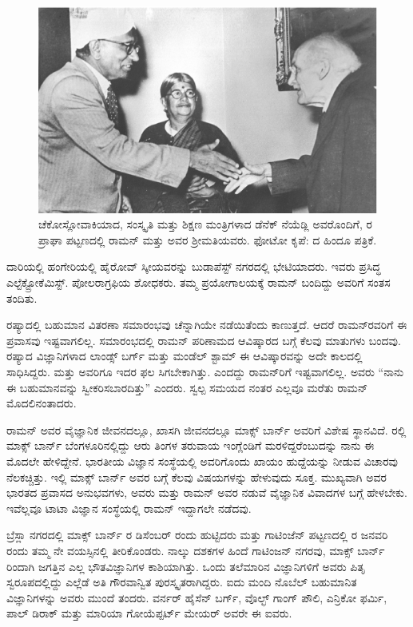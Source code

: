 \begin{figure}[!b]
\centering
\includegraphics[scale=0.225]{"images/9.jpg"}
\caption{ಚೆಕೋಸ್ಲೋವಾಕಿಯಾದ, ಸಂಸ್ಕೃತಿ ಮತ್ತು ಶಿಕ್ಷಣ ಮಂತ್ರಿಗಳಾದ ಡೆನೆಕ್ ನೆಯೆಡ್ಲಿ ಅವರೊಂದಿಗೆ, ರ ಪ್ರಾಘಾ ಪಟ್ಟಣದಲ್ಲಿ ರಾಮನ್ ಮತ್ತು ಅವರ ಶ‍್ರೀಮತಿಯವರು. ಫೋಟೋ ಕೃಪೆ: ದ ಹಿಂದೂ ಪತ್ರಿಕೆ.}\label{chap3-fig02}
\end{figure}

ದಾರಿಯಲ್ಲಿ ಹಂಗೇರಿಯಲ್ಲಿ ಹೈರೋವ್ ಸ್ಕೀಯವರನ್ನು ಬುಡಾಪೆಸ್ಟ್ ನಗರದಲ್ಲಿ ಭೇಟಿಯಾದರು. ಇವರು ಪ್ರಸಿದ್ಧ ಎಲ್ಟೆಕ್ಟ್ರೋಕೆಮಿಸ್ಟ್. ಪೋಲರಾಗ್ರಫಿಯ ಶೋಧಕರು. ತಮ್ಮ ಪ್ರಯೋಗಾಲಯಕ್ಕೆ ರಾಮನ್ ಬಂದಿದ್ದು ಅವರಿಗೆ ಸಂತಸ ತಂದಿತು.

ರಷ್ಯಾದಲ್ಲಿ ಬಹುಮಾನ ವಿತರಣಾ ಸಮಾರಂಭವು ಚೆನ್ನಾಗಿಯೇ ನಡೆಯಿತೆಂದು ಕಾಣುತ್ತದೆ. ಆದರೆ ರಾಮನ್‍ರವರಿಗೆ ಈ ಪ್ರವಾಸವು ಇಷ್ಟವಾಗಲಿಲ್ಲ. ಸಮಾರಂಭದಲ್ಲಿ ರಾಮನ್ ಪರಿಣಾಮದ ಆವಿಷ್ಕಾರದ ಬಗ್ಗೆ ಕೆಲವು ಮಾತುಗಳು ಬಂದವು. ರಷ್ಯಾದ ವಿಜ್ಞಾನಿಗಳಾದ ಲಾಂಡ್ಸ್ ಬರ್ಗ್ ಮತ್ತು ಮಂಡೆಲ್ ಶ್ಟಾಮ್ ಈ ಆವಿಷ್ಕಾರವನ್ನು ಅದೇ ಕಾಲದಲ್ಲಿ ಸಾಧಿಸಿದ್ದರು. ಮತ್ತು ಅವರಿಗೂ ಇದರ ಫಲ ಸಿಗಬೇಕಾಗಿತ್ತು. ಎಂದದ್ದು ರಾಮನ್‍ರಿಗೆ ಇಷ್ಟವಾಗಲಿಲ್ಲ. ಅವರು “ನಾನು ಈ ಬಹುಮಾನವನ್ನು ಸ್ವೀಕರಿಸಬಾರದಿತ್ತು” ಎಂದರು. ಸ್ವಲ್ಪ ಸಮಯದ ನಂತರ ಎಲ್ಲವೂ ಮರೆತು ರಾಮನ್ ಮೊದಲಿ\-ನಂತಾದರು.



ರಾಮನ್ ಅವರ ವೈಜ್ಞಾನಿಕ ಜೀವನದಲ್ಲೂ, ಖಾಸಗಿ ಜೀವನದಲ್ಲೂ ಮಾಕ್ಸ್ ಬಾರ್ನ್ ಅವರಿಗೆ ವಿಶೇಷ ಸ್ಥಾನವಿದೆ. ರಲ್ಲಿ ಮಾಕ್ಸ್ ಬಾರ್ನ್ ಬೆಂಗಳೂರಿನಲ್ಲಿದ್ದು ಆರು ತಿಂಗಳ ತರುವಾಯ ಇಂಗ್ಲೆಂಡಿಗೆ ಮರಳಿದ್ದರೆಂಬುದನ್ನು ನಾನು ಈ ಮೊದಲೇ ಹೇಳಿದ್ದೇನೆ. ಭಾರತೀಯ ವಿಜ್ಞಾನ ಸಂಸ್ಥೆಯಲ್ಲಿ ಅವರಿಗೊಂದು ಖಾಯಂ ಹುದ್ದೆಯನ್ನು ನೀಡುವ ವಿಚಾರವು ನೆಲಕಚ್ಚಿತ್ತು. ಇಲ್ಲಿ ಮಾಕ್ಸ್ ಬಾರ್ನ್ ಅವರ ಬಗ್ಗೆ ಕೆಲವು ವಿಷಯಗಳನ್ನು ಹೇಳುವುದು ಸೂಕ್ತ. ಮುಖ್ಯವಾಗಿ ಅವರ ಭಾರತದ ಪ್ರವಾಸದ ಅನುಭವಗಳು, ಅವರು ಮತ್ತು ರಾಮನ್ ಅವರ ನಡುವೆ ವೈಜ್ಞಾನಿಕ ವಿವಾದಗಳ ಬಗ್ಗೆ ಹೇಳಬೇಕು. ಇವೆಲ್ಲವೂ ಟಾಟಾ ವಿಜ್ಞಾನ ಸಂಸ್ಥೆಯಲ್ಲಿ ರಾಮನ್ ಇದ್ದಾಗಲೇ ನಡೆದವು.

ಬ್ರೆಸ್ಲಾ ನಗರದಲ್ಲಿ ಮಾಕ್ಸ್ ಬಾರ್ನ್ ರ ಡಿಸೆಂಬರ್  ರಂದು ಹುಟ್ಟಿದರು ಮತ್ತು ಗಾಟಿಂಜೆನ್ ಪಟ್ಟಣದಲ್ಲಿ ರ ಜನವರಿ  ರಂದು ತಮ್ಮ ನೇ ವಯಸ್ಸಿನಲ್ಲಿ ತೀರಿಕೊಂಡರು. ನಾಲ್ಕು ದಶಕಗಳ ಹಿಂದೆ ಗಾಟಿಂಜನ್ ನಗರವು, ಮಾಕ್ಸ್ ಬಾರ್ನ್ ರಿಂದಾಗಿ ಜಗತ್ತಿನ ಎಲ್ಲ ಭೌತವಿಜ್ಞಾನಿಗಳ ಕಾಶಿಯಾಗಿತ್ತು. ಒಂದು ತಲೆಮಾರಿನ ವಿಜ್ಞಾನಿಗಳಿಗೆ ಅವರು ಪಿತೃ ಸ್ವರೂಪದಲ್ಲಿದ್ದು ಎಲ್ಲೆಡೆ ಅತಿ ಗೌರವಾನ್ವಿತ ಪುರಸ್ಕೃತರಾಗಿದ್ದರು. ಐದು ಮಂದಿ ನೊಬೆಲ್ ಬಹುಮಾನಿತ ವಿಜ್ಞಾನಿಗಳನ್ನು ಅವರು ಮುಂದೆ ತಂದರು. ವರ್ನರ್ ಹೈಸೆನ್ ಬರ್ಗ್, ವೊಲ್ಛ್ ಗಾಂಗ್ ಪೌಲಿ, ಎನ್ರಿಕೋ ಫರ್ಮಿ, ಪಾಲ್ ಡಿರಾಕ್ ಮತ್ತು ಮಾರಿಯಾ ಗೋಯೆಪ್ಪರ್ಟ್ ಮೇಯರ್ ಅವರೇ ಈ ಐವರು.

